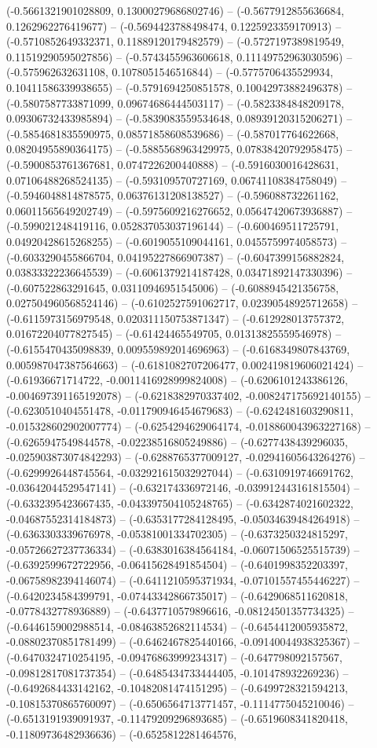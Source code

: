 	(-0.5661321901028809, 0.13000279686802746) -- (-0.5677912855636684, 0.1262962276419677) -- (-0.5694423788498474, 0.1225923359170913) -- (-0.5710852649332371, 0.11889120179482579) -- (-0.5727197389819549, 0.11519290595027856) -- (-0.5743455963606618, 0.11149752963030596) -- (-0.575962632631108, 0.1078051546516844) -- (-0.5775706435529934, 0.10411586339938655) -- (-0.5791694250851578, 0.10042973882496378) -- (-0.5807587733871099, 0.09674686444503117) -- (-0.5823384848209178, 0.09306732433985894) -- (-0.5839083559534648, 0.08939120315206271) -- (-0.5854681835590975, 0.08571858608539686) -- (-0.587017764622668, 0.08204955890364175) -- (-0.5885568963429975, 0.07838420792958475) -- (-0.5900853761367681, 0.0747226200440888) -- (-0.5916030016428631, 0.07106488268524135) -- (-0.593109570727169, 0.06741108384758049) -- (-0.5946048814878575, 0.06376131208138527) -- (-0.596088732261162, 0.06011565649202749) -- (-0.5975609216276652, 0.05647420673936887) -- (-0.599021248419116, 0.052837053037196144) -- (-0.600469511725791, 0.04920428615268255) -- (-0.6019055109044161, 0.0455759974058573) -- (-0.6033290455866704, 0.04195227866907387) -- (-0.6047399156882824, 0.03833322236645539) -- (-0.6061379214187428, 0.03471892147330396) -- (-0.607522863291645, 0.03110946951545006) -- (-0.6088945421356758, 0.027504960568524146) -- (-0.6102527591062717, 0.02390548925712658) -- (-0.6115973156979548, 0.020311150753871347) -- (-0.612928013757372, 0.01672204077827545) -- (-0.61424465549705, 0.01313825559546978) -- (-0.6155470435098839, 0.009559892014696963) -- (-0.6168349807843769, 0.005987047387564663) -- (-0.6181082707206477, 0.002419819606021424) -- (-0.61936671714722, -0.0011416928999824008) -- (-0.6206101243386126, -0.004697391165192078) -- (-0.6218382970337402, -0.008247175692140155) -- (-0.6230510404551478, -0.011790946454679683) -- (-0.6242481603290811, -0.015328602902007774) -- (-0.6254294629064174, -0.018860043963227168) -- (-0.6265947549844578, -0.02238516805249886) -- (-0.6277438439296035, -0.025903873074842293) -- (-0.6288765377009127, -0.02941605643264276) -- (-0.6299926448745564, -0.032921615032927044) -- (-0.6310919746691762, -0.03642044529547141) -- (-0.632174336972146, -0.039912443161815504) -- (-0.6332395423667435, -0.043397504105248765) -- (-0.6342874021602322, -0.04687552314184873) -- (-0.6353177284128495, -0.05034639484264918) -- (-0.6363303339676978, -0.05381001334702305) -- (-0.6373250324815297, -0.05726627237736334) -- (-0.6383016384564184, -0.06071506525515739) -- (-0.6392599672722956, -0.06415628491854504) -- (-0.6401998352203397, -0.06758982394146074) -- (-0.6411210595371934, -0.07101557455446227) -- (-0.6420234584399791, -0.07443342866735017) -- (-0.6429068511620818, -0.0778432778936889) -- (-0.6437710579896616, -0.08124501357734325) -- (-0.6446159002988514, -0.08463852682114534) -- (-0.6454412005935872, -0.08802370851781499) -- (-0.6462467825440166, -0.09140044938325367) -- (-0.6470324710254195, -0.09476863999234317) -- (-0.647798092157567, -0.09812817081737354) -- (-0.6485434733444405, -0.101478932269236) -- (-0.6492684433142162, -0.10482081474151295) -- (-0.6499728321594213, -0.10815370865760097) -- (-0.6506564713771457, -0.1114775045210046) -- (-0.6513191939091937, -0.11479209296893685) -- (-0.6519608341820418, -0.11809736482936636) -- (-0.6525812281464576, 